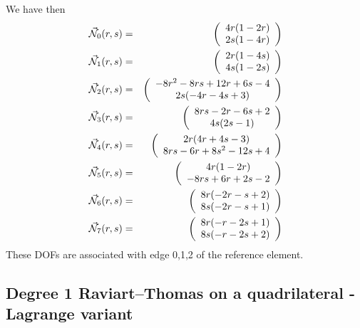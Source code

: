 We have then
\begin{eqnarray}
\vec{{\mathcal{N}}}_0(r,s) &=& \left( \begin{array}{c} 4r(1-2r)\\2s(1-4r)  \end{array} \right) \nonumber\\
\vec{{\mathcal{N}}}_1(r,s) &=& \left( \begin{array}{c} 2r(1-4s)\\4s(1-2s)  \end{array} \right) \nonumber\\
\vec{{\mathcal{N}}}_2(r,s) &=& \left( \begin{array}{c} -8r^2-8rs+12r+6s-4\\2s(-4r-4s+3)  \end{array} \right) \nonumber\\
\vec{{\mathcal{N}}}_3(r,s) &=& \left( \begin{array}{c} 8rs-2r-6s+2\\4s(2s-1)  \end{array} \right) \nonumber\\
\vec{{\mathcal{N}}}_4(r,s) &=& \left( \begin{array}{c} 2r(4r+4s-3)\\8rs-6r+8s^2-12s+4  \end{array} \right) \nonumber\\
\vec{{\mathcal{N}}}_5(r,s) &=& \left( \begin{array}{c} 4r(1-2r)\\-8rs+6r+2s-2  \end{array} \right) \nonumber\\
\vec{{\mathcal{N}}}_6(r,s) &=& \left( \begin{array}{c} 8r(-2r-s+2)\\8s(-2r-s+1)  \end{array} \right) \nonumber\\
\vec{{\mathcal{N}}}_7(r,s) &=& \left( \begin{array}{c} 8r(-r-2s+1)\\8s(-r-2s+2)  \end{array} \right) \nonumber
\end{eqnarray}
These DOFs are associated with edge 0,1,2 of the reference element.

\subsection{Degree 1 Raviart–Thomas on a quadrilateral - Lagrange variant}

